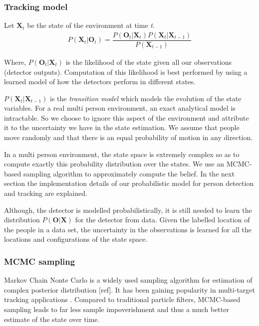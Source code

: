 \subsubsection{Tracking model}

Let $\textbf{X}_{t}$ be the state of the environment at time \textit{t}.
\begin{align}
P(\textbf{X}_{t} | \textbf{O}_{t}) = \dfrac{P(\textbf{O}_{t} | \textbf{X}_{t}) P(\textbf{X}_{t}|\textbf{X}_{t-1})} {P(\textbf{X}_{t-1})}
\end{align} 

Where, $P(\textbf{O}_{t} | \textbf{X}_{t})$ is the likelihood of the state given all our observations (detector outputs). Computation of this likelihood is best performed by using a learned model of how the detectors perform in different states.

$P(\textbf{X}_{t}|\textbf{X}_{t-1})$ is the \textit{transition model} which models the evolution of the state variables. For a real multi person environment, an exact analytical model is intractable. So we choose to ignore this aspect of the environment and attribute it to the uncertainty we have in the state estimation. We assume that people move randomly and that there is an equal probability of motion in any direction. 

In a multi person environment, the state space is extremely complex so as to compute exactly this probability 
distribution over the states. We use an MCMC-based sampling algorithm to approximately compute the belief. In the next section the implementation details of our probabilistic model for person detection and tracking are explained.


Although, the detector is modelled probabilistically, it is still needed to learn the distribution $P(\textbf{O}|\textbf{X})$ for the detector from data. Given the labelled location of the people in a data set, the uncertainty in the observations is learned for all the locations and configurations of the state space.



\subsubsection{MCMC sampling}
\label{MCMC}
Markov Chain Nonte Carlo is a widely used sampling algorithm for estimation of complex posterior distribution [ref]. It has been gaining popularity in multi-target tracking applications \cite{khan2004mcmc}. Compared to traditional particle filters, MCMC-based sampling leads to far less sample impoverishment%
 and thus a much better estimate of the state over time.

